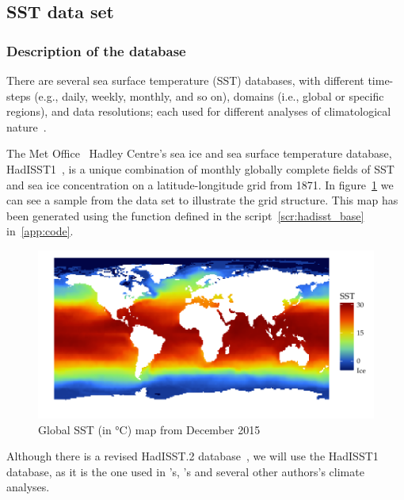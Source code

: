 \subsection{SST data set}\label{sec:sst}

\subsubsection{Description of the database}\label{ssec:hadisst-intro}
There are several sea surface temperature (SST) databases, with different time-steps (e.g., daily, weekly, monthly, and so on), domains (i.e., global or specific regions), and data resolutions; each used for different analyses of climatological nature~\cite{o:sst-comparison, Rayner2003}.

The Met Office~\cite{o:met-office} Hadley Centre's sea ice and sea surface temperature database, HadISST1~\cite{o:hadisst1}, is a unique combination of monthly globally complete fields of SST and sea ice concentration on a latitude-longitude grid from 1871. In figure~\ref{fig:sst-raster-map} we can see a sample from the data set to illustrate the grid structure. This map has been generated using the function  defined in the script~\ref{scr:hadisst_base} in~\cref{app:code}.
\begin{figure}[H]
	\centering
	\includegraphics[width=\textwidth]{images/sst-raster-map}
	\caption{Global SST (in \si{\celsius}) map from December 2015}
	\label{fig:sst-raster-map}
\end{figure}

Although there is a revised HadISST.2 database~\cite{o:hadisst2}, we will use the HadISST1 database, as it is the one used in \citeauthor{Corral2010}'s, \citeauthor{Webster2005}'s and several other authors's climate analyses.

